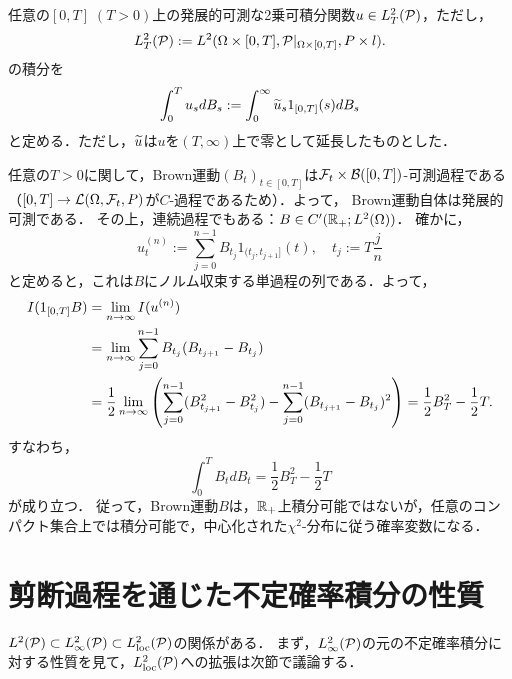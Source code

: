 \documentclass[uplatex,dvipdfmx]{jsreport}
\begin{document}
\begin{definition}[有限区間上の不定積分]
    任意の$[0,T]\;(T>0)$上の発展的可測な2乗可積分関数$u\in L^2_T(\P)$，ただし，
    \[L^2_T(\P):=L^2(\Om\times[0,T],\P|_{\Om\times[0,T]},P\times l).\]
    の積分を
    \[\int^T_0u_sdB_s:=\int^\infty_0\wt{u}_s1_{[0,T]}(s)dB_s\]
    と定める．ただし，$\wt{u}$は$u$を$(T,\infty)$上で零として延長したものとした．
\end{definition}

\begin{example}[Brown運動の不定積分]\label{exp-integral-of-Brownian-motion}
    任意の$T>0$に関して，Brown運動$(B_t)_{t\in[0,T]}$は$\F_t\times\B([0,T])$-可測過程である（$[0,T]\to\L(\Om,\F_t,P)$が$C$-過程であるため）．よって，
    Brown運動自体は発展的可測である．
    その上，連続過程でもある：$B\in C'(\R_+;L^2(\Om))$．
    確かに，
    \[u^{(n)}_t:=\sum^{n-1}_{j=0}B_{t_j}1_{(t_j,t_{j+1}]}(t),\quad t_j:=T\frac{j}{n}\]
    と定めると，これは$B$にノルム収束する単過程の列である．よって，
    \begin{align*}
        I(1_{[0,T]}B)&=\lim_{n\to\infty}I(u^{(n)})\\
        &=\lim_{n\to\infty}\sum^{n-1}_{j=0}B_{t_j}(B_{t_{j+1}}-B_{t_j})\\
        &=\frac{1}{2}\lim_{n\to\infty}\paren{\sum^{n-1}_{j=0}(B_{t_{j+1}}^2-B^2_{t_j})-\sum^{n-1}_{j=0}(B_{t_{j+1}}-B_{t_j})^2}=\frac{1}{2}B_T^2-\frac{1}{2}T.
    \end{align*}
    すなわち，
    \[\int^T_0B_tdB_t=\frac{1}{2}B^2_T-\frac{1}{2}T\]
    が成り立つ．
    従って，Brown運動$B$は，$\R_+$上積分可能ではないが，任意のコンパクト集合上では積分可能で，中心化された$\chi^2$-分布に従う確率変数になる．
\end{example}

\section{剪断過程を通じた不定確率積分の性質}

\begin{tcolorbox}[colframe=ForestGreen, colback=ForestGreen!10!white,breakable,colbacktitle=ForestGreen!40!white,coltitle=black,fonttitle=\bfseries\sffamily,
title=]
    $L^2(\P)\subset L^2_\infty(\P)\subset L^2_\loc(\P)$の関係がある．
    まず，$L^2_\infty(\P)$の元の不定確率積分に対する性質を見て，$L^2_\loc(\P)$への拡張は次節で議論する．
\end{tcolorbox}
\end{document}
